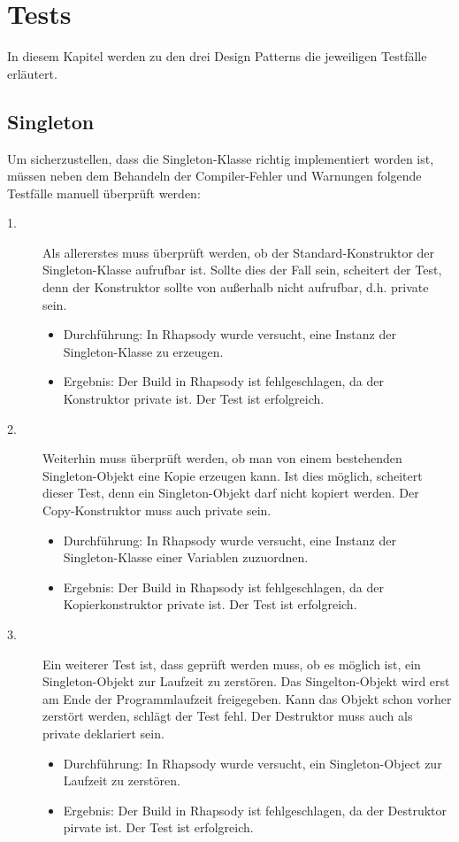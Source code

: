 \chapter{Tests}

In diesem Kapitel werden zu den drei Design Patterns die jeweiligen Testfälle erläutert.

\section{Singleton}

Um sicherzustellen, dass die Singleton-Klasse richtig implementiert worden ist, müssen neben dem Behandeln der Compiler-Fehler und Warnungen folgende Testfälle manuell überprüft werden: 

\begin{description}
  \item[1.]
  Als allererstes muss überprüft werden, ob der Standard-Konstruktor der Singleton-Klasse aufrufbar ist. Sollte dies der Fall sein, scheitert der Test, denn der Konstruktor sollte von außerhalb nicht aufrufbar, d.h. private sein.
  \begin{itemize}
  \item{Durchführung:}
  In Rhapsody wurde versucht, eine Instanz der Singleton-Klasse zu erzeugen.
  \item{Ergebnis:}
  Der Build in Rhapsody ist fehlgeschlagen, da der Konstruktor private ist. Der
  Test ist erfolgreich.
  \end{itemize}
  
  \item[2.]
  Weiterhin muss überprüft werden, ob man von einem bestehenden Singleton-Objekt eine Kopie erzeugen kann. Ist dies möglich, scheitert dieser Test, denn ein Singleton-Objekt darf nicht kopiert werden. Der Copy-Konstruktor muss auch private sein.
  \begin{itemize}
  	\item{Durchführung:}
  	In Rhapsody wurde versucht, eine Instanz der Singleton-Klasse einer Variablen
  	zuzuordnen.
  	\item{Ergebnis:}
  	Der Build in Rhapsody ist fehlgeschlagen, da der Kopierkonstruktor private
  	ist.
  	Der Test ist erfolgreich.
  \end{itemize}
  
  \item[3.]
  Ein weiterer Test ist, dass geprüft werden muss, ob es möglich ist, ein Singleton-Objekt zur Laufzeit zu zerstören. Das Singelton-Objekt wird erst am Ende der Programmlaufzeit freigegeben. Kann das Objekt schon vorher zerstört werden, schlägt der Test fehl. Der Destruktor muss auch als private deklariert sein.
  \begin{itemize}
  	\item{Durchführung:}
  	In Rhapsody wurde versucht, ein Singleton-Object zur Laufzeit zu zerstören.
  	\item{Ergebnis:}
  	Der Build in Rhapsody ist fehlgeschlagen, da der Destruktor pirvate ist. Der
  	Test ist erfolgreich.
  \end{itemize}
  

\end{description}
